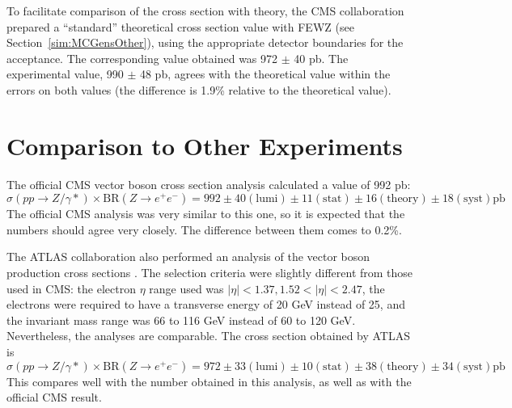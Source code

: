 To facilitate comparison of the cross section 
with theory, 
the CMS collaboration prepared a ``standard'' 
theoretical cross section value with FEWZ 
(see Section~\ref{sim:MCGensOther}), 
using the appropriate detector boundaries 
for the acceptance.  
The corresponding value obtained was 
972 $\pm$ 40 pb.  
The experimental value, 990 $\pm$ 48 pb, 
agrees with the theoretical value within 
the errors on both values 
(the difference is 1.9\% relative 
to the theoretical value).  


\section{Comparison to Other Experiments}
\label{res:prev}


The official CMS vector boson cross section analysis 
\cite{CMSWZ}  
calculated a value of 992 pb: 
\[
\sigma(pp \rightarrow Z/\gamma *) \times \mathrm{BR}(Z \rightarrow e^+ e^- )
= 992 \pm 40 \mathrm{(lumi)} \pm 11 \mathrm{(stat)} \pm 16 \mathrm{(theory)} \pm 18 \mathrm{(syst)} \mathrm{pb}
\]  
The official CMS analysis was very similar 
to this one, 
so it is expected that the numbers should 
agree very closely.  
The difference between them comes to 0.2\%.  

The ATLAS collaboration also performed an analysis 
of the vector boson production cross sections 
\cite{ATLASZ}. 
The selection criteria were slightly different 
from those used in CMS: 
the electron $\eta$ range used was 
$|\eta| < 1.37, 1.52 < |\eta| < 2.47$, 
the electrons were required to have a 
transverse energy of 20 GeV instead of 25, 
and the invariant mass range was 66 to 116 GeV 
instead of 60 to 120 GeV.  
Nevertheless, the analyses are comparable.  
The \Zee cross section obtained by ATLAS is 
\[
\sigma(pp \rightarrow Z/\gamma *) \times \mathrm{BR}(Z \rightarrow e^+ e^- )
= 972 \pm 33 \mathrm{(lumi)} \pm 10 \mathrm{(stat)} \pm 38 \mathrm{(theory)} \pm 34 \mathrm{(syst)} \mathrm{pb} 
\]
This compares well with the number obtained 
in this analysis, 
as well as with the official CMS result.  



\clearpage